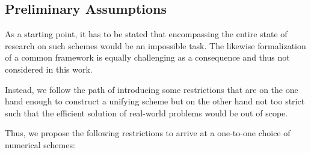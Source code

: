 \documentclass[asi,article,submit,moreauthors]{Definitions/mdpi}
\begin{document}
\subsection{Preliminary Assumptions}\label{sec:restrictions}

As a starting point, it has to be stated that encompassing the entire state of research on such schemes would be an impossible task.
The likewise formalization of a common framework is equally challenging as a consequence and thus not considered in this work.

Instead, we follow the path of introducing some restrictions that are on the one hand enough to construct a unifying scheme but on the other hand not too strict such that the efficient solution of real-world problems would be out of scope.


Thus, we propose the following restrictions to arrive at a one-to-one choice of numerical schemes:
\end{document}
